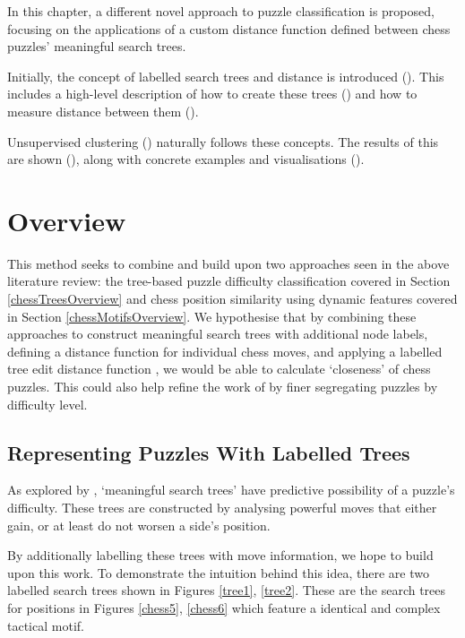 In this chapter, a different novel approach to puzzle classification is
proposed, focusing on the applications of a custom distance function defined
between chess puzzles' meaningful search trees.

Initially, the concept of labelled search trees and distance is introduced
(). This includes a high-level description of how to create these
trees () and how to measure distance between them
().

Unsupervised clustering () naturally follows these concepts. The
results of this are shown (), along with concrete examples and
visualisations ().

\section{Overview}\label{treeS1}

This method seeks to combine and build upon two approaches seen in the above
literature review: the tree-based puzzle difficulty classification
\citep{chessTrees} covered in Section \ref{chessTreesOverview} and chess
position similarity using dynamic features \citep{chessMotifs} covered in
Section \ref{chessMotifsOverview}. We hypothesise that by combining these
approaches to construct meaningful search trees with additional node labels,
defining a distance function for individual chess moves, and applying a
labelled tree edit distance function \citep{editDistTrees}, we would be able to
calculate `closeness' of chess puzzles. This could also help refine the work of
\citet{chessTrees} by finer segregating puzzles by difficulty level.

\subsection{Representing Puzzles With Labelled Trees}\label{treeS11}

As explored by \citet{chessTrees}, `meaningful search trees' have predictive
possibility of a puzzle's difficulty. These trees are constructed by analysing
powerful moves that either gain, or at least do not worsen a side's position. 

By additionally labelling these trees with move information, we hope to build
upon this work. To demonstrate the intuition behind this idea, there are two
labelled search trees shown in Figures \ref{tree1}, \ref{tree2}. These are the
search trees for positions in Figures \ref{chess5}, \ref{chess6} which feature
a identical and complex tactical motif. 


